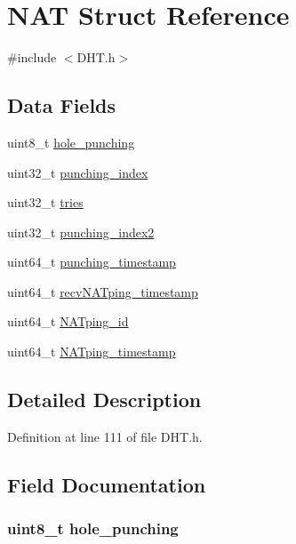 \hypertarget{struct_n_a_t}{\section{N\+A\+T Struct Reference}
\label{struct_n_a_t}
}


{\ttfamily \#include $<$D\+H\+T.\+h$>$}

\subsection*{Data Fields}
\begin{DoxyCompactItemize}
\item 
uint8\+\_\+t \hyperlink{struct_n_a_t_a40495f11f0e91fcea43d57248e202ea3}{hole\+\_\+punching}
\item 
uint32\+\_\+t \hyperlink{struct_n_a_t_aeb4b0f7724adb0857b15e0f34e95ecca}{punching\+\_\+index}
\item 
uint32\+\_\+t \hyperlink{struct_n_a_t_a852b5b4a6ac0e351887ab6dde3e3fcc5}{tries}
\item 
uint32\+\_\+t \hyperlink{struct_n_a_t_a1d36817a78a0e261e7ca0982e17aa4ee}{punching\+\_\+index2}
\item 
uint64\+\_\+t \hyperlink{struct_n_a_t_ab8cadc230283568e7aeb303691d8e374}{punching\+\_\+timestamp}
\item 
uint64\+\_\+t \hyperlink{struct_n_a_t_a237df5177fc9db865722933b5b6468ea}{recv\+N\+A\+Tping\+\_\+timestamp}
\item 
uint64\+\_\+t \hyperlink{struct_n_a_t_addd9408d04ff8e05c569651b299f1b1b}{N\+A\+Tping\+\_\+id}
\item 
uint64\+\_\+t \hyperlink{struct_n_a_t_a20937663f98914b69bb73f938deed531}{N\+A\+Tping\+\_\+timestamp}
\end{DoxyCompactItemize}


\subsection{Detailed Description}


Definition at line 111 of file D\+H\+T.\+h.



\subsection{Field Documentation}
\hypertarget{struct_n_a_t_a40495f11f0e91fcea43d57248e202ea3}{
\subsubsection[{hole\+\_\+punching}]{\setlength{\rightskip}{0pt plus 5cm}uint8\+\_\+t hole\+\_\+punching}}\label{struct_n_a_t_a40495f11f0e91fcea43d57248e202ea3}


